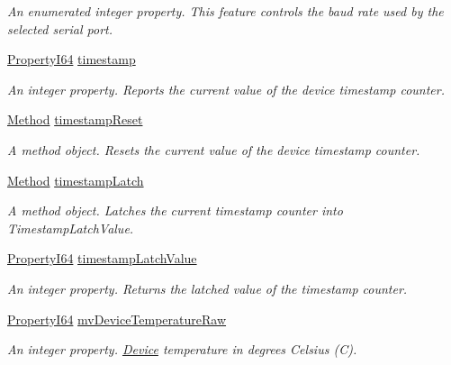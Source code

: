 \begin{DoxyCompactItemize}
\begin{DoxyCompactList}\small\item\em An enumerated integer property. This feature controls the baud rate used by the selected serial port. \end{DoxyCompactList}\item 
\hyperlink{group___common_interface_ga81749b2696755513663492664a18a893}{Property\+I64} \hyperlink{classmv_i_m_p_a_c_t_1_1acquire_1_1_gen_i_cam_1_1_device_control_aac2c5f9af3720bdd277c34ccda97e7a6}{timestamp}
\begin{DoxyCompactList}\small\item\em An integer property. Reports the current value of the device timestamp counter. \end{DoxyCompactList}\item 
\hyperlink{classmv_i_m_p_a_c_t_1_1acquire_1_1_method}{Method} \hyperlink{classmv_i_m_p_a_c_t_1_1acquire_1_1_gen_i_cam_1_1_device_control_a10806972cf9d8272b34769de825db3d4}{timestamp\+Reset}
\begin{DoxyCompactList}\small\item\em A method object. Resets the current value of the device timestamp counter. \end{DoxyCompactList}\item 
\hyperlink{classmv_i_m_p_a_c_t_1_1acquire_1_1_method}{Method} \hyperlink{classmv_i_m_p_a_c_t_1_1acquire_1_1_gen_i_cam_1_1_device_control_a9f7d5ffaf2717052f55c6eb3ddaa8e35}{timestamp\+Latch}
\begin{DoxyCompactList}\small\item\em A method object. Latches the current timestamp counter into Timestamp\+Latch\+Value. \end{DoxyCompactList}\item 
\hyperlink{group___common_interface_ga81749b2696755513663492664a18a893}{Property\+I64} \hyperlink{classmv_i_m_p_a_c_t_1_1acquire_1_1_gen_i_cam_1_1_device_control_a05c3e26d9ac8eae5af54a267811451eb}{timestamp\+Latch\+Value}
\begin{DoxyCompactList}\small\item\em An integer property. Returns the latched value of the timestamp counter. \end{DoxyCompactList}\item 
\hyperlink{group___common_interface_ga81749b2696755513663492664a18a893}{Property\+I64} \hyperlink{classmv_i_m_p_a_c_t_1_1acquire_1_1_gen_i_cam_1_1_device_control_a02e49d3e69035f6221d919a791e9f739}{mv\+Device\+Temperature\+Raw}
\begin{DoxyCompactList}\small\item\em An integer property. \hyperlink{classmv_i_m_p_a_c_t_1_1acquire_1_1_device}{Device} temperature in degrees Celsius (C). \end{DoxyCompactList}\item 

\end{DoxyCompactItemize}
